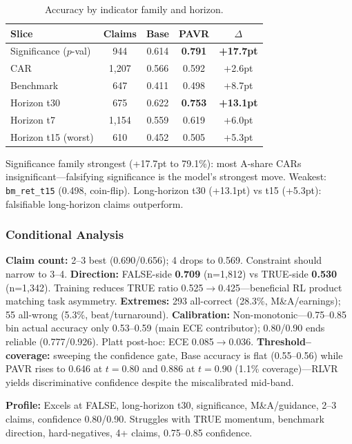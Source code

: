 \documentclass[sigconf, anonymous, review]{acmart}
\begin{document}
\begin{table}[t]
\centering\small
\caption{Accuracy by indicator family and horizon.}
\label{tab:byfamily}
\begin{tabular}{@{}lcccc@{}}
\toprule
Slice & Claims & Base & PAVR & $\Delta$ \\
\midrule
Significance ($p$-val) & 944 & 0.614 & \textbf{0.791} & \textbf{+17.7pt} \\
CAR & 1,207 & 0.566 & 0.592 & +2.6pt \\
Benchmark & 647 & 0.411 & 0.498 & +8.7pt \\
Horizon t30 & 675 & 0.622 & \textbf{0.753} & \textbf{+13.1pt} \\
Horizon t7 & 1,154 & 0.559 & 0.619 & +6.0pt \\
Horizon t15 (worst) & 610 & 0.452 & 0.505 & +5.3pt \\
\bottomrule
\end{tabular}
\end{table}

Significance family strongest (+17.7pt to 79.1\%): most A-share CARs insignificant---falsifying significance is the model's strongest move. Weakest: \texttt{bm\_ret\_t15} (0.498, coin-flip). Long-horizon t30 (+13.1pt) vs t15 (+5.3pt): falsifiable long-horizon claims outperform.

\subsubsection{Conditional Analysis}
\label{sec:conditional}

\textbf{Claim count:} 2--3 best (0.690/0.656); 4 drops to 0.569. Constraint should narrow to 3--4.
\textbf{Direction:} FALSE-side \textbf{0.709} (n=1,812) vs TRUE-side \textbf{0.530} (n=1,342). Training reduces TRUE ratio 0.525$\to$0.425---beneficial RL product matching task asymmetry.
\textbf{Extremes:} 293 all-correct (28.3\%, M\&A/earnings); 55 all-wrong (5.3\%, beat/turnaround).
\textbf{Calibration:} Non-monotonic---0.75--0.85 bin actual accuracy only 0.53--0.59 (main ECE contributor); 0.80/0.90 ends reliable (0.777/0.926). Platt post-hoc: ECE 0.085$\to$0.036. \textbf{Threshold--coverage:} sweeping the confidence gate, Base accuracy is flat (0.55--0.56) while PAVR rises to 0.646 at $t\!=\!0.80$ and 0.886 at $t\!=\!0.90$ (1.1\% coverage)---RLVR yields discriminative confidence despite the miscalibrated mid-band.

\textbf{Profile:} Excels at FALSE, long-horizon t30, significance, M\&A/guidance, 2--3 claims, confidence 0.80/0.90. Struggles with TRUE momentum, benchmark direction, hard-negatives, 4+ claims, 0.75--0.85 confidence.
\end{document}
